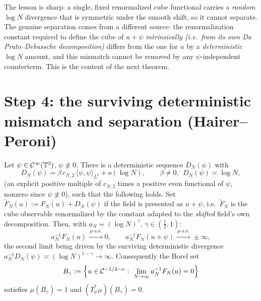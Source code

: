 \noindent The lesson is sharp: a single, fixed renormalized cube functional carries a
\emph{random} $\log N$ divergence that is symmetric under the smooth shift, so it
cannot separate. The genuine separation comes from a different source: the
renormalization constant required to define the cube of $u+\psi$ \emph{intrinsically
(i.e.\ from its own Da Prato--Debussche decomposition)} differs from the one for $u$ by
a \emph{deterministic} $\log N$ amount, and this mismatch cannot be removed by any
$\psi$-independent counterterm. This is the content of the next theorem.

\section*{Step 4: the surviving deterministic mismatch and separation (Hairer--Peroni)}

\begin{qonetheorem}\label{thm:HP}
Let $\psi\in\mathcal{C}^\infty(\mathbb{T}^3)$, $\psi\not\equiv0$. There is a deterministic
sequence $D_N(\psi)$ with
\begin{equation}\label{eq:mismatch}
D_N(\psi)=\beta\,c_{N,2}\,\langle\psi,\psi\rangle_{L^2}+o(\log N),\qquad \beta\ne0,\ \ D_N(\psi)\asymp\log N,
\end{equation}
(an explicit positive multiple of $c_{N,2}$ times a positive even functional of $\psi$,
nonzero since $\psi\not\equiv0$), such that the following holds. Set
$\widetilde F_N(u):=F_N(u)+D_N(\psi)$ if the field is presented as $u+\psi$, i.e.\
$\widetilde F_N$ is the cube observable renormalized by the constant adapted to the
\emph{shifted} field's own decomposition. Then, with $a_N=(\log N)^\gamma$,
$\gamma\in(\tfrac12,1)$:
\begin{equation}\label{eq:sep}
a_N^{-1}F_N(u)\xrightarrow{\ \mu\text{-a.s.}\ }0,\qquad
a_N^{-1}F_N(u+\psi)\xrightarrow{\ \mu\text{-a.s.}\ }\pm\infty,
\end{equation}
the second limit being driven by the surviving deterministic divergence
$a_N^{-1}D_N(\psi)\asymp(\log N)^{1-\gamma}\to\infty$. Consequently the Borel set
\begin{equation}\label{eq:Bgamma}
B_\gamma:=\Bigl\{u\in\qoneC^{-1/2-\kappa}:\ \lim_{N\to\infty}a_N^{-1}F_N(u)=0\Bigr\}
\end{equation}
satisfies $\mu(B_\gamma)=1$ and $(T_\psi^*\mu)(B_\gamma)=0$.
\end{qonetheorem}

